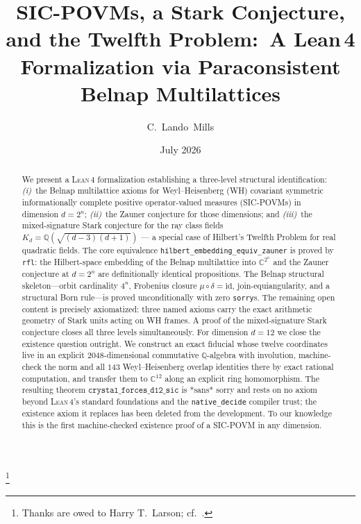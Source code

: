 \documentclass[12pt,a4paper]{article}
\newcommand{\Kd}{K_d}
\newcommand{\frob}{\mu \circ \delta = \mathrm{id}}
\newcommand{\Lean}{\textsc{Lean\,4}}
\begin{document}
\title{\textbf{SIC-POVMs, a Stark Conjecture, and the Twelfth Problem:\
A Lean\,4 Formalization via Paraconsistent Belnap Multilattices}}
\author{C.\ Lando\ Mills}
\thanks{Thanks are owed to Harry T.\ Larson; cf.\ \cite{Larson1961}.}
\date{July 2026}
\maketitle
\begin{abstract}
We present a \Lean{} formalization establishing a three-level structural
identification: \emph{(i)}~the Belnap multilattice axioms for
Weyl--Heisenberg (WH) covariant symmetric informationally complete
positive operator-valued measures (SIC-POVMs) in dimension $d = 2^n$;
\emph{(ii)}~the Zauner conjecture for those dimensions; and
\emph{(iii)}~the mixed-signature Stark conjecture for the ray class fields
$\Kd = \mathbb{Q}(\sqrt{(d-3)(d+1)})$ --- a special case of Hilbert's Twelfth
Problem for real quadratic fields. The core equivalence
\texttt{hilbert\_embedding\_equiv\_zauner} is proved by \texttt{rfl}: the
Hilbert-space embedding of the Belnap multilattice into $\mathbb{C}^{2^n}$
and the Zauner conjecture at $d = 2^n$ are definitionally identical
propositions. The Belnap structural skeleton---orbit cardinality $4^n$,
Frobenius closure $\frob$, join-equiangularity, and a structural Born
rule---is proved unconditionally with zero \texttt{sorry}s.
The remaining open content is precisely axiomatized: three named axioms
carry the exact arithmetic geometry of Stark units acting on WH frames.
A proof of the mixed-signature Stark conjecture closes all three levels
simultaneously.
For dimension $d = 12$ we close the existence question outright. We
construct an exact fiducial whose twelve coordinates live in an explicit
$2048$-dimensional commutative $\mathbb{Q}$-algebra with involution,
machine-check the norm and all $143$ Weyl--Heisenberg overlap identities
there by exact rational computation, and transfer them to $\mathbb{C}^{12}$
along an explicit ring homomorphism. The resulting theorem
$\texttt{crystal\_forces\_d12\_sic}$ is *sans* sorry and rests on no axiom
beyond \Lean{}'s standard foundations and the \texttt{native\_decide}
compiler trust; the existence axiom it replaces has been deleted from the
development. To our knowledge this is the first machine-checked existence
proof of a SIC-POVM in any dimension.
\end{abstract}
\tableofcontents
\newpage
\end{document}
